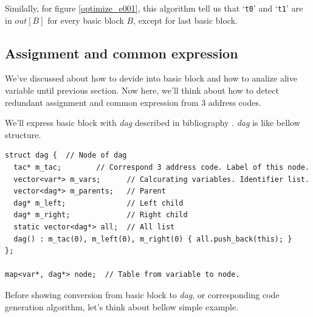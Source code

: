 \vspace{0.5cm}

Similally, for figure \ref{optimize_e001},
this algorithm tell us that
`{\tt{t0}}' and `{\tt{t1}}'
are in $out[B]$ for every basic block $B$, except for last basic block.

\subsection{Assignment and common expression}
\label{optimize_e_assign}
We've discussed about how to devide into basic block
and how to analize alive variable until previous section. Now here, 
we'll think about how to detect redundant assignment and common
expression from 3 address codes.

We'll express basic block with {\em dag} described in bibliography
 \cite{doragon}. {\em dag} is like bellow structure.

\begin{verbatim}
struct dag {  // Node of dag
  tac* m_tac;        // Correspond 3 address code. Label of this node.
  vector<var*> m_vars;      // Calcurating variables. Identifier list.
  vector<dag*> m_parents;   // Parent
  dag* m_left;              // Left child
  dag* m_right;             // Right child
  static vector<dag*> all;  // All list
  dag() : m_tac(0), m_left(0), m_right(0) { all.push_back(this); }
};

map<var*, dag*> node;  // Table from variable to node.
\end{verbatim}

Before showing conversion from basic block to {\em dag},
or corresponding code generation algorithm,
let's think about bellow simple example.


